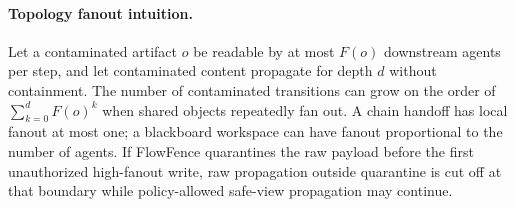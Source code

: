 \paragraph{Topology fanout intuition.}
Let a contaminated artifact $o$ be readable by at most $F(o)$ downstream agents per step, and let contaminated content propagate for depth $d$ without containment. The number of contaminated transitions can grow on the order of $\sum_{k=0}^{d}F(o)^k$ when shared objects repeatedly fan out. A chain handoff has local fanout at most one; a blackboard workspace can have fanout proportional to the number of agents. If FlowFence quarantines the raw payload before the first unauthorized high-fanout write, raw propagation outside quarantine is cut off at that boundary while policy-allowed safe-view propagation may continue.
